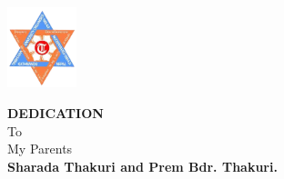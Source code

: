 \begin{center}
	\includegraphics[width=0.15\textwidth]{pictures/tulogo.png}
\end{center}
\begin {center}
\vspace{1.5cm}

{\Large{\bfseries {DEDICATION}}}\\[2cm]

To\\[0.5cm]
My Parents\\
{\bfseries {\color{blue} Sharada Thakuri and Prem Bdr. Thakuri.}}\\[8mm]
\end {center}

\clearpage